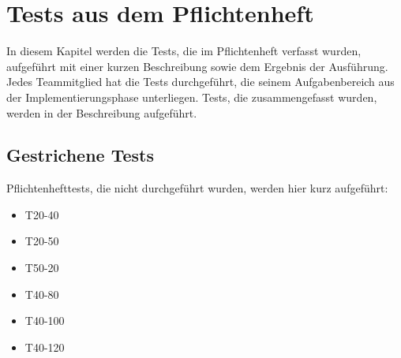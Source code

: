 \chapter{Tests aus dem Pflichtenheft}

In diesem Kapitel werden die Tests, die im Pflichtenheft verfasst wurden, aufgeführt mit einer kurzen Beschreibung sowie dem Ergebnis der Ausführung.
Jedes Teammitglied hat die Tests durchgeführt, die seinem Aufgabenbereich aus der Implementierungsphase unterliegen.
Tests, die zusammengefasst wurden, werden in der Beschreibung aufgeführt.

\section{Gestrichene Tests}

Pflichtenhefttests, die nicht durchgeführt wurden, werden hier kurz aufgeführt:

\begin{itemize}

\item T20-40
\item T20-50
\item T50-20
\item T40-80
\item T40-100
\item T40-120

\end{itemize}

